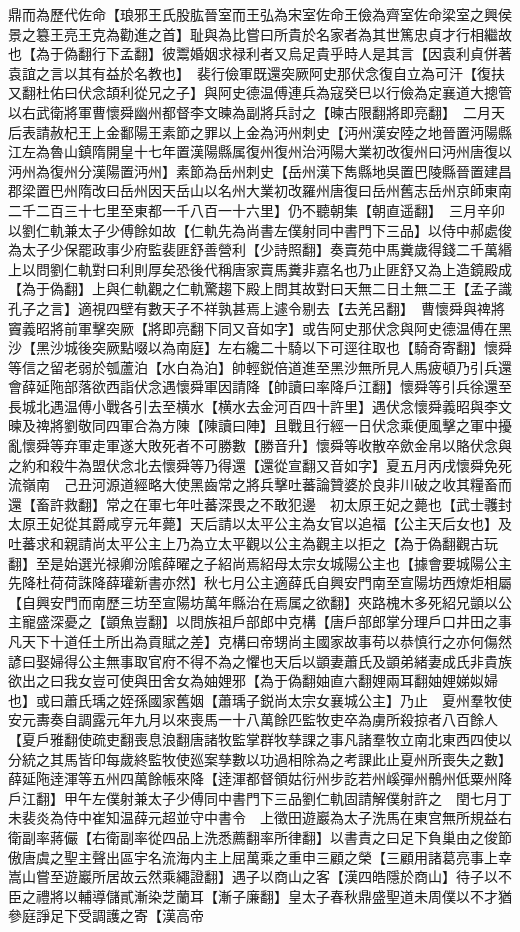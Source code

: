 鼎而為歷代佐命【琅邪王氏股肱晉室而王弘為宋室佐命王儉為齊室佐命梁室之興侯景之簒王亮王克為勸進之首】耻與為比嘗曰所貴於名家者為其世篤忠貞才行相繼故也【為于偽翻行下孟翻】彼鬻婚姻求禄利者又烏足貴乎時人是其言【因袁利貞併著袁誼之言以其有益於名教也】　裴行儉軍既還突厥阿史那伏念復自立為可汗【復扶又翻杜佑曰伏念頡利從兄之子】與阿史德温傅連兵為寇癸巳以行儉為定襄道大摠管以右武衛將軍曹懷舜幽州都督李文暕為副將兵討之【暕古限翻將即亮翻】　二月天后表請赦杞王上金鄱陽王素節之罪以上金為沔州刺史【沔州漢安陸之地晉置沔陽縣江左為魯山鎮隋開皇十七年置漢陽縣属復州復州治沔陽大業初改復州曰沔州唐復以沔州為復州分漢陽置沔州】素節為岳州刺史【岳州漢下雋縣地吳置巴陵縣晉置建昌郡梁置巴州隋改曰岳州因天岳山以名州大業初改羅州唐復曰岳州舊志岳州京師東南二千二百三十七里至東都一千八百一十六里】仍不聽朝集【朝直遥翻】　三月辛卯以劉仁軌兼太子少傅餘如故【仁軌先為尚書左僕射同中書門下三品】以侍中郝處俊為太子少保罷政事少府監裴匪舒善營利【少詩照翻】奏賣苑中馬糞歲得錢二千萬緡上以問劉仁軌對曰利則厚矣恐後代稱唐家賣馬糞非嘉名也乃止匪舒又為上造鏡殿成【為于偽翻】上與仁軌觀之仁軌驚趨下殿上問其故對曰天無二日土無二王【孟子識孔子之言】適視四壁有數天子不祥孰甚焉上遽令剔去【去羌呂翻】　曹懷舜與禆將竇義昭將前軍擊突厥【將即亮翻下同又音如字】或告阿史那伏念與阿史德温傅在黑沙【黑沙城後突厥點啜以為南庭】左右纔二十騎以下可逕往取也【騎奇寄翻】懷舜等信之留老弱於瓠蘆泊【水白為泊】帥輕鋭倍道進至黑沙無所見人馬疲頓乃引兵還會薛延陁部落欲西詣伏念遇懷舜軍因請降【帥讀曰率降戶江翻】懷舜等引兵徐還至長城北遇温傅小戰各引去至横水【横水去金河百四十許里】遇伏念懷舜義昭與李文暕及禆將劉敬同四軍合為方陳【陳讀曰陣】且戰且行經一日伏念乘便風擊之軍中擾亂懷舜等弃軍走軍遂大敗死者不可勝數【勝音升】懷舜等收散卒歛金帛以賂伏念與之約和殺牛為盟伏念北去懷舜等乃得還【還從宣翻又音如字】夏五月丙戌懷舜免死流嶺南　己丑河源道經略大使黑齒常之將兵擊吐蕃論贊婆於良非川破之收其糧畜而還【畜許救翻】常之在軍七年吐蕃深畏之不敢犯邊　初太原王妃之薨也【武士彠封太原王妃從其爵咸亨元年薨】天后請以太平公主為女官以追福【公主天后女也】及吐蕃求和親請尚太平公主上乃為立太平觀以公主為觀主以拒之【為于偽翻觀古玩翻】至是始選光禄卿汾隂薛曜之子紹尚焉紹母太宗女城陽公主也【據會要城陽公主先降杜荷荷誅降薛瓘新書亦然】秋七月公主適薛氏自興安門南至宣陽坊西燎炬相屬【自興安門而南歷三坊至宣陽坊萬年縣治在焉属之欲翻】夾路槐木多死紹兄顗以公主寵盛深憂之【顗魚豈翻】以問族祖戶部郎中克構【唐戶部郎掌分理戶口井田之事凡天下十道任土所出為貢賦之差】克構曰帝甥尚主國家故事苟以恭慎行之亦何傷然諺曰娶婦得公主無事取官府不得不為之懼也天后以顗妻蕭氏及顗弟緒妻成氏非貴族欲出之曰我女豈可使與田舍女為妯娌邪【為于偽翻妯直六翻娌兩耳翻妯娌娣姒婦也】或曰蕭氏瑀之姪孫國家舊姻【蕭瑀子鋭尚太宗女襄城公主】乃止　夏州羣牧使安元夀奏自調露元年九月以來喪馬一十八萬餘匹監牧吏卒為虜所殺掠者八百餘人【夏戶雅翻使疏吏翻喪息浪翻唐諸牧監掌群牧孳課之事凡諸羣牧立南北東西四使以分統之其馬皆印每歲終監牧使廵案孳數以功過相除為之考課此止夏州所喪失之數】　薛延陁逹渾等五州四萬餘帳來降【逹渾都督領姑衍州步訖若州嵠彈州鶻州低粟州降戶江翻】甲午左僕射兼太子少傅同中書門下三品劉仁軌固請解僕射許之　閏七月丁未裴炎為侍中崔知温薛元超並守中書令　上徵田遊巖為太子洗馬在東宫無所規益右衛副率蔣儼【右衛副率從四品上洗悉薦翻率所律翻】以書責之曰足下負巢由之俊節傲唐虞之聖主聲出區宇名流海内主上屈萬乘之重申三顧之榮【三顧用諸葛亮事上幸嵩山嘗至遊巖所居故云然乘繩證翻】遇子以商山之客【漢四皓隱於商山】待子以不臣之禮將以輔導儲貳漸染芝蘭耳【漸子廉翻】皇太子春秋鼎盛聖道未周僕以不才猶參庭諍足下受調護之寄【漢高帝